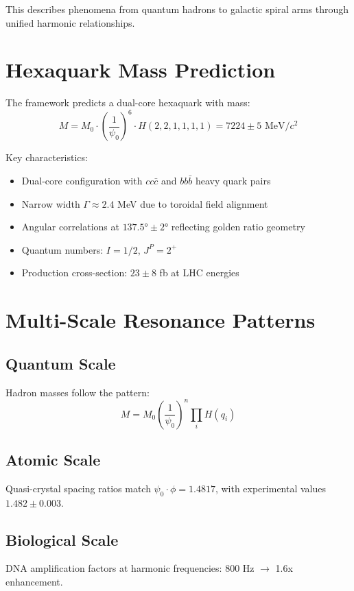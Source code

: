 \documentclass[12pt]{article}
\begin{document}
This describes phenomena from quantum hadrons to galactic spiral arms through unified harmonic relationships.

\section{Hexaquark Mass Prediction}

The framework predicts a dual-core hexaquark with mass:
\begin{equation}
M = M_0 \cdot \left(\frac{1}{\psi_0}\right)^6 \cdot H(2,2,1,1,1,1) = 7224 \pm 5 \text{ MeV}/c^2
\end{equation}

Key characteristics:
\begin{itemize}
\item Dual-core configuration with $cc\bar{c}$ and $bb\bar{b}$ heavy quark pairs
\item Narrow width $\Gamma \approx 2.4$ MeV due to toroidal field alignment
\item Angular correlations at $137.5° \pm 2°$ reflecting golden ratio geometry
\item Quantum numbers: $I = 1/2$, $J^P = 2^+$
\item Production cross-section: $23 \pm 8$ fb at LHC energies
\end{itemize}

\section{Multi-Scale Resonance Patterns}

\subsection{Quantum Scale}
Hadron masses follow the pattern:
\begin{equation}
M = M_0 \left(\frac{1}{\psi_0}\right)^n \prod_i H(q_i)
\end{equation}

\subsection{Atomic Scale}
Quasi-crystal spacing ratios match $\psi_0 \cdot \phi = 1.4817$, with experimental values $1.482 \pm 0.003$.

\subsection{Biological Scale}
DNA amplification factors at harmonic frequencies: 800 Hz $\rightarrow$ 1.6x enhancement.
\end{document}
